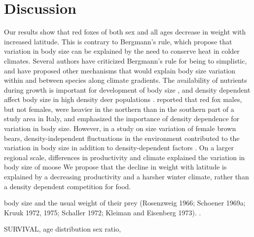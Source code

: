 \documentclass[12pt, a4paper]{article}
\begin{document}


\section*{Discussion}

Our results show that red foxes of both sex and all ages decrease in weight with increased latitude. This is contrary to Bergmann's rule, which propose that variation in body size can be explained by the need to conserve heat in colder climates. Several authors have criticized Bergmann's rule for being to simplistic, and have proposed other mechanisms that would explain body size variation within and between species along climate gradients\citep{mcnabEcologicalSignificanceBergmanns1971,blackburnGeographicGradientsBody1999a,frafjord1998red}. The availability of nutrients during growth is important for development of body size \citep{geistBergmannsRuleInvalid1987}, and density dependent affect body size in high density deer populations \citep{albonEarlyDevelopmentPopulation1987,festa-bianchetEarlyDevelopmentAdult2000,gaillardCohortEffectsDeer2003}. \citet{cavalliniVariationBodySize1995} reported that red fox males, but not females, were heavier in the northern than in the southern part of a study area in Italy, and emphasized the importance of density dependence for variation in body size. However, in a study on size variation of female brown bears, density-independent fluctuations in the environment contributed to the variation in body size in addition to density-dependent factors \citep{zedrosserPOPULATIONDENSITYFOOD2006}. On a larger regional scale, differences in productivity and climate explained the variation in body size of moose \citep{hjeljordRangebodyMassInteractions1999} We propose that the decline in weight with latitude is explained by a decreasing productivity and a harsher winter climate, rather than a density dependent competition for food.

body size and the usual weight of their prey (Rosenzweig 1966; Schoener 1969a; Kruuk 1972,
1975; Schaller 1972; Kleiman and Eisenberg 1973). \citep{gittlemanCarnivoreBodySize1985}.



SURVIVAL, age distribution sex ratio,
\end{document}
